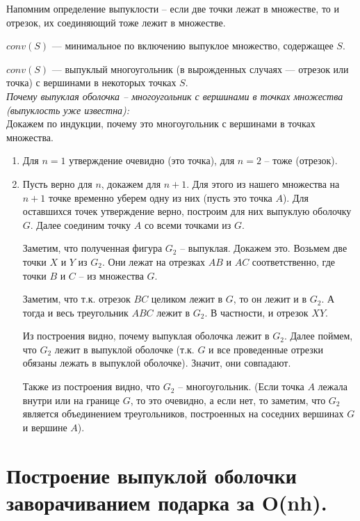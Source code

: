 \Def Напомним определение выпуклости -- если две точки лежат в множестве, то и отрезок, их соединяющий тоже лежит в множестве.

\Note $conv (S)$ — минимальное по включению выпуклое множество, содержащее $S$.

\Note $conv (S)$ — выпуклый многоугольник (в вырожденных случаях — отрезок или точка) с вершинами в некоторых точках $S$.\\

\textit{Почему выпуклая оболочка -- многоугольник с вершинами в точках множества (выпуклость уже известна):}\\
\Proof Докажем по индукции, почему это многоугольник с вершинами в точках множества.
\begin{enumerate}
    \item Для $n = 1$ утверждение очевидно (это точка), для $n = 2$ -- тоже (отрезок).
    \item Пусть верно для $n$, докажем для $n + 1$. Для этого из нашего множества на $n + 1$ точке временно уберем одну из них (пусть это точка $A$). Для оставшихся точек утверждение верно, построим для них выпуклую оболочку $G$. Далее соединим точку $A$ со всеми точками из $G$.
    
    Заметим, что полученная фигура $G_2$ -- выпуклая. Докажем это. Возьмем две точки $X$ и $Y$ из $G_2$. Они лежат на отрезках $AB$ и $AC$ соответственно, где точки $B$ и $C$ -- из множества $G$.
    
    Заметим, что т.к. отрезок $BC$ целиком лежит в $G$, то он лежит и в $G_2$. А тогда и весь треугольник $ABC$ лежит в $G_2$. В частности, и отрезок $XY$.
    
    Из построения видно, почему выпуклая оболочка лежит в $G_2$. Далее поймем, что $G_2$ лежит в выпуклой оболочке (т.к. $G$ и все проведенные отрезки обязаны лежать в выпуклой оболочке). Значит, они совпадают. 
    
    Также из построения видно, что $G_2$ -- многоугольник. (Если точка $A$ лежала внутри или на границе $G$, то это очевидно, а если нет, то заметим, что $G_2$ является объединением треугольников, построенных на соседних вершинах $G$ и вершине $A$).
\end{enumerate}
\EndProof
\newpage{}

\section{Построение выпуклой оболочки заворачиванием подарка за O(nh).}

